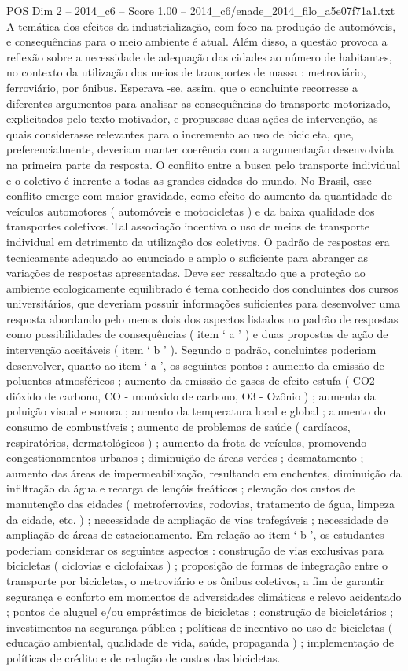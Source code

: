 \begin{textsample}{POS Dim 2 – 2014\_c6 – Score 1.00 – 2014\_c6/enade\_2014\_filo\_a5e07f71a1.txt}
A temática dos efeitos da industrialização, com foco na produção de automóveis, e consequências para o meio ambiente é atual.
Além disso, a questão provoca a reflexão sobre a necessidade de adequação das cidades ao número de habitantes, no contexto da utilização dos meios de transportes de massa : metroviário, ferroviário, por ônibus.
Esperava -se, assim, que o concluinte recorresse a diferentes argumentos para analisar as consequências do transporte motorizado, explicitados pelo texto motivador, e propusesse duas ações de intervenção, as quais considerasse relevantes para o incremento ao uso de bicicleta, que, preferencialmente, deveriam manter coerência com a argumentação desenvolvida na primeira parte da resposta.
O conflito entre a busca pelo transporte individual e o coletivo é inerente a todas as grandes cidades do mundo.
No Brasil, esse conflito emerge com maior gravidade, como efeito do aumento da quantidade de veículos automotores ( automóveis e motocicletas ) e da baixa qualidade dos transportes coletivos.
Tal associação incentiva o uso de meios de transporte individual em detrimento da utilização dos coletivos.
O padrão de respostas era tecnicamente adequado ao enunciado e amplo o suficiente para abranger as variações de respostas apresentadas.
Deve ser ressaltado que a proteção ao ambiente ecologicamente equilibrado é tema conhecido dos concluintes dos cursos universitários, que deveriam possuir informações suficientes para desenvolver uma resposta abordando pelo menos dois dos aspectos listados no padrão de respostas como possibilidades de consequências ( item ‘ a ’ ) e duas propostas de ação de intervenção aceitáveis ( item ‘ b ’ ).
Segundo o padrão, concluintes poderiam desenvolver, quanto ao item ‘ a ’, os seguintes pontos : aumento da emissão de poluentes atmosféricos ; aumento da emissão de gases de efeito estufa ( CO2- dióxido de carbono, CO - monóxido de carbono, O3 - Ozônio ) ; aumento da poluição visual e sonora ; aumento da temperatura local e global ; aumento do consumo de combustíveis ; aumento de problemas de saúde ( cardíacos, respiratórios, dermatológicos ) ; aumento da frota de veículos, promovendo congestionamentos urbanos ; diminuição de áreas verdes ; desmatamento ; aumento das áreas de impermeabilização, resultando em enchentes, diminuição da infiltração da água e recarga de lençóis freáticos ; elevação dos custos de manutenção das cidades ( metroferrovias, rodovias, tratamento de água, limpeza da cidade, etc. ) ; necessidade de ampliação de vias trafegáveis ; necessidade de ampliação de áreas de estacionamento.
Em relação ao item ‘ b ’, os estudantes poderiam considerar os seguintes aspectos : construção de vias exclusivas para bicicletas ( ciclovias e ciclofaixas ) ; proposição de formas de integração entre o transporte por bicicletas, o metroviário e os ônibus coletivos, a fim de garantir segurança e conforto em momentos de adversidades climáticas e relevo acidentado ; pontos de aluguel e/ou empréstimos de bicicletas ; construção de bicicletários ; investimentos na segurança pública ; políticas de incentivo ao uso de bicicletas ( educação ambiental, qualidade de vida, saúde, propaganda ) ; implementação de políticas de crédito e de redução de custos das bicicletas.

\end{textsample}
